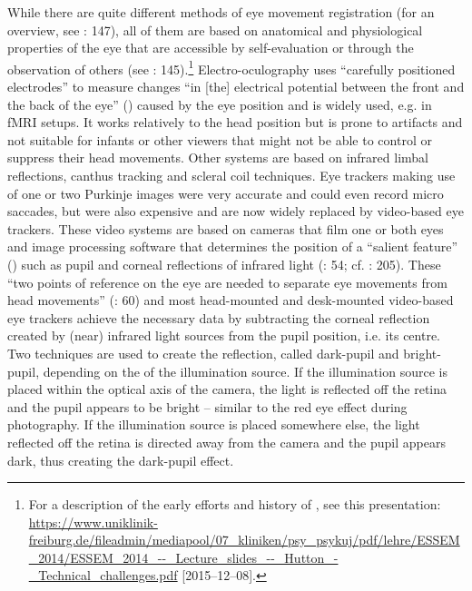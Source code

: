 While there are quite different methods of eye movement registration (for an overview, see \citealt{rickheit2003}: 147), all of them are based on anatomical and physiological properties of the eye that are accessible by self-evaluation or through the observation of others (see \citealt{rickheit2003}: 145).\footnote{For a description of the early efforts and history of , see this presentation: \url{https://www.uniklinik-freiburg.de/fileadmin/mediapool/07_kliniken/psy_psykuj/pdf/lehre/ESSEM_2014/ESSEM_2014_--_Lecture_slides_--_Hutton_-_Technical_challenges.pdf} [2015--12--08].} Electro-oculography uses “carefully positioned electrodes” to measure changes “in [the] electrical potential between the front and the back of the eye” (\citealt{technical_challenges2014}) caused by the eye position and is widely used, e.g. in fMRI setups. It works relatively to the head position but is prone to artifacts and not suitable for infants or other viewers that might not be able to control or suppress their head movements. Other systems are based on infrared limbal reflections, canthus tracking and scleral coil techniques. Eye trackers making use of one or two Purkinje images were very accurate and could even record micro saccades, but were also expensive and are now widely replaced by video-based eye trackers. These video systems are based on cameras that film one or both eyes and image processing software that determines the position of a “salient feature” (\citealt{technical_challenges2014}) such as pupil and corneal reflections of infrared light (\citealt{Duchowski2007}: 54; cf. \citealt{Hvelplund2014}: 205). These “two points of reference on the eye are needed to separate eye movements from head movements” (\citealt{Duchowski2007}: 60) and most head-mounted and desk-mounted video-based eye trackers achieve the necessary data by subtracting the corneal reflection created by (near) infrared light sources from the pupil position, i.e. its centre. Two techniques are used to create the reflection, called dark-pupil and bright-pupil, depending on the  of the illumination source. If the illumination source is placed within the optical axis of the camera, the light is reflected off the retina and the pupil appears to be bright – similar to the red eye effect during photography. If the illumination source is placed somewhere else, the light reflected off the retina is directed away from the camera and the pupil appears dark, thus creating the dark-pupil effect.

